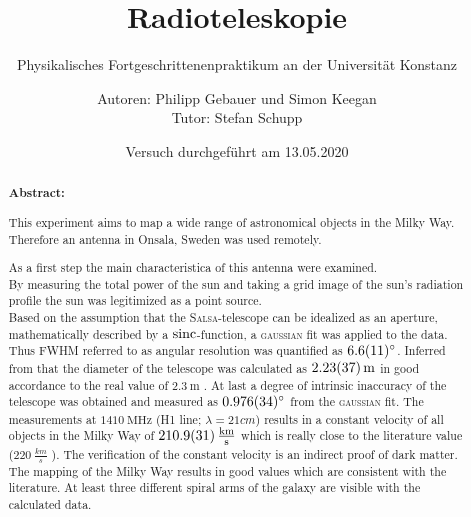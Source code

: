 \title{Radioteleskopie}
\subtitle{Physikalisches Fortgeschrittenenpraktikum an der Universität Konstanz}
\author{Autoren: Philipp Gebauer und Simon Keegan \\ \large{Tutor: Stefan Schupp}}
\date{Versuch durchgeführt am 13.05.2020}
\maketitle
\vspace{2.5 cm}
\begin{abstract}
    \vspace{1cm}
    \noindent \textbf{Abstract:}
    \begin{singlespace}
    This experiment aims to map a wide range of astronomical objects in the Milky Way. Therefore an antenna in Onsala, Sweden was used remotely.

    As a first step the main characteristica of this antenna were examined.\\
    By measuring the total power of the sun and taking a grid image of the sun's radiation profile the sun was legitimized as a point source. \\
    Based on the assumption that the \textsc{Salsa}-telescope can be idealized as an aperture, mathematically described by a $\operatorname{sinc}$-function, a \textsc{gaussian} fit was applied to the data. Thus FWHM referred to as angular resolution was quantified as $\SI{6.6 \pm 1.1}{\degree}$. Inferred from that the diameter of the telescope was calculated as $\SI{2.23 \pm 0.37}{\metre}$ in good accordance to the real value of $\SI{2.3}{\metre}$ \cite{Usermanual}. At last a degree of intrinsic inaccuracy of the telescope was obtained and measured as $\SI{0.976 \pm 0.034}{\degree}$ from the \textsc{gaussian} fit.\newline
    The measurements at $\SI{1410}{\mega \hertz}$ (H1 line; $\lambda = \si{21}{cm}$) results in a constant velocity of all objects in the Milky Way of $\SI{210.9 \pm 3.1}{\frac{km}{s}}$ which is really close to the literature value ($\SI{220}{\frac{km}{s}}$ \cite{LSR}). The verification of the constant velocity is an indirect proof of dark matter.\newline
    The mapping of the Milky Way results in good values which are consistent with the literature. At least three different spiral arms of the galaxy are visible with the calculated data.
    \end{singlespace}
\end{abstract}
\thispagestyle{empty}
\newpage